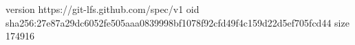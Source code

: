 version https://git-lfs.github.com/spec/v1
oid sha256:27e87a29dc6052fe505aaa0839998bf1078f92cfd49f4c159d22d5ef705fcd44
size 174916
